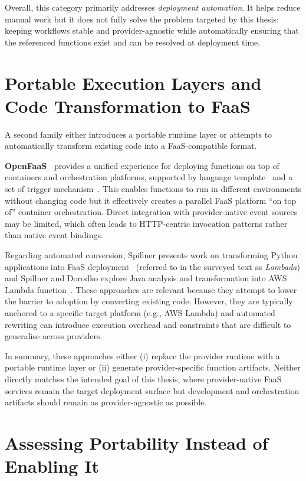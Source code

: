 Overall, this category primarily addresses \textit{deployment automation}. It helps reduce manual work but it does not fully solve the problem targeted by this thesis: keeping workflows stable and provider-agnostic while automatically ensuring that the referenced functions exist and can be resolved at deployment time.

\section{Portable Execution Layers and Code Transformation to FaaS}

A second family either introduces a portable runtime layer or attempts to automatically transform existing code into a FaaS-compatible format.

\textbf{OpenFaaS~\cite{openFaaS}} provides a unified experience for deploying functions on top of containers and orchestration platforms, supported by language template~\cite{openFaaSTemplates} and a set of trigger mechanism~\cite{openFaaSTriggers}. This enables functions to run in different environments without changing code but it effectively creates a parallel FaaS platform ``on top of'' container orchestration. Direct integration with provider-native event sources may be limited, which often leads to HTTP-centric invocation patterns rather than native event bindings.

Regarding automated conversion, Spillner presents work on transforming Python applications into FaaS deployment~\cite{spillner2017pythonfaas} (referred to in the surveyed text as \textit{Lambada}) and Spillner and Dorodko explore Java analysis and transformation into AWS Lambda function~\cite{spillnerDorodko2017javaLambda}. These approaches are relevant because they attempt to lower the barrier to adoption by converting existing code. However, they are typically anchored to a specific target platform (e.g., AWS Lambda) and automated rewriting can introduce execution overhead and constraints that are difficult to generalise across providers.

In summary, these approaches either (i) replace the provider runtime with a portable runtime layer or (ii) generate provider-specific function artifacts. Neither directly matches the intended goal of this thesis, where provider-native FaaS services remain the target deployment surface but development and orchestration artifacts should remain as provider-agnostic as possible.

\section{Assessing Portability Instead of Enabling It}

